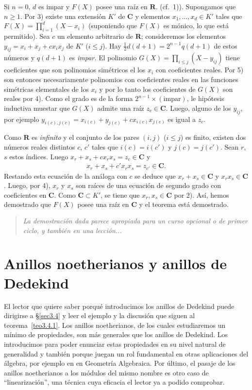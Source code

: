 \documentclass[bibtotoc,leqno,spanish]{amsbook}
\newcommand{\RR}{\mathbf{R}}
\newcommand{\CC}{\mathbf{C}}
\numberwithin{equation}{section}
\newenvironment{comm}%
	{\begin{quotation}\itshape\Small}
	{\end{quotation}}
\theoremstyle{note}
\theoremstyle{note}
\theoremstyle{rem}
\numberwithin{theorem}{section}
\numberwithin{proposition}{section}
\numberwithin{definition}{section}
\numberwithin{lemma}{section}
\numberwithin{corollary}{section}
\numberwithin{example}{section}
\numberwithin{footnote}{section}%
\begin{document}
Si $n = 0$, $d$ es impar y
$F(X)$ posee una ra\'iz en $\RR$. (cf.~1)). Supongamos que $n \geq 1$. Por 3) existe una extensi\'on
$K'$ de $\CC$ y elementos $x_{1},\dots,x_{d}\in K'$ tales que $F(X) = \prod_{i=1}^{d}(X-x_{i})$
(suponiendo que $F(X)$ es m\'onico, lo que est\'a permitido). Sea $c$ un elemento arbitrario de $\RR$;
consideremos los elementos $y_{ij} = x_{i}+x_{j}+cx_{i}x_{j}$ de $K'$ ($i\leq j$). Hay
$\frac{1}{2}d(d+1) = 2^{n-1}q(d+1)$ de estos n\'umeros y $q(d+1)$ es {\em impar.} El polinomio
$G(X) = \prod_{i\leq j}(X-y_{ij})$ tiene coeficientes que son polinomios sim\'etricos el los $x_{i}$
con coeficientes reales. Por 5) son entonces necesariamente polinomios con coeficientes reales
en las funciones sim\'etricas elementales de los $x_{i}$ y por lo tanto los coeficientes de $G(X)$
son reales por 4). Como el grado es de la forma $2^{n-1}\times(\text{impar})$, le hip\'otesis
inductiva muestar que $G(X)$ admite una ra\'iz $z_{c}\in\CC$. Luego, alguno de los $y_{ij}$,
por ejemplo $y_{i(c),j(c)} = x_{i(c)}+y_{j(c)}+cx_{i(c)}x_{j(c)}$ es igual a $z_{c}$.

Como $\RR$ es {\em infinito} y el conjunto de los pares $(i,j)$ ($i\leq j$) es finito, existen
dos n\'umeros reales distintos $c$, $c'$ tales que $i(c) = i(c')$ y $j(c) = j(c')$. Sean $r$, $s$
estos \'indices. Luego $x_{r}+x_{s}+cx_{r}x_{s} = z_{c}\in\CC$ y
\begin{gather*}
x_{r}+x_{s}+c'x_{r}x_{s}=z_{c'}\in\CC.
\end{gather*}
Restando esta ecuaci\'on de la an\'aloga con $c$ se deduce que $x_{r}+x_{s}\in\CC$ y $x_{r}x_{s}\in\CC$.
Luego, por 4), $x_{r}$ y $x_{s}$ son ra\'ices de una ecuaci\'on de segundo grado con coeficientes
en $\CC$. Como $\CC\subset K'$, se tiene que $x_{r},x_{s}\in\CC$ por 2). As\'i, hemos demostrado que
$F(X)$ posee una ra\'iz en $\CC$ y el teorema est\'a demostrado.

\begin{comm}
La demostraci\'on dada parece apropiada para un curso opcional o de primer ciclo, y tambi\'en
en una lecci\'on...
\end{comm}

\chapter{Anillos noetherianos y anillos de Dedekind}\label{cap3}

El lector que quiere saber porqu\'e introducimos los anillos de Dedekind puede dirigirse
a \S\ref{sec3.4} y leer el ejemplo y la discusi\'on que siguen al teorema~\ref{teo3.4.1}.
Los anillos noetherianos, de los cuales estudiaremos un m\'inimo de propiedades, son m\'as generales que los
anillos de Dedekind. Los introducimos para poder enunciar estas propiedades en su
nivel natural de generalidad y tambi\'en porque juegan un rol fundamental en otras aplicaciones
del \'algebra, por ejemplo en en Geometr\'ia Algebraica. Por \'ultimo, el pasaje de los anillos noetherianos
a los m\'odulos del mismo nombre es otro caso de ``linearizaci\'on'', una t\'ecnica cuya eficacia
el lector ya a podido comprobar.
\end{document}
